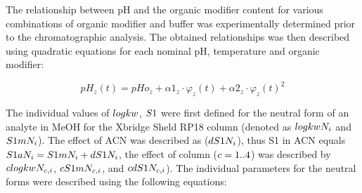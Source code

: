 \documentclass[
]{article}
\begin{document}
The relationship between pH and the organic modifier content for various
combinations of organic modifier and buffer was experimentally
determined prior to the chromatographic analysis. The obtained
relationships was then described using quadratic equations for each
nominal pH, temperature and organic modifier:

\[
pH_z(t)=pHo_z+\alpha 1_z\cdot \varphi_z(t)+\alpha2_z\cdot {\varphi_z(t)}^2
\]

The individual values of \(\small logkw\), \(\small S1\) were first
defined for the neutral form of an analyte in MeOH for the Xbridge Sheld
RP18 column (denoted as \(\small logkwN_i\) and \(\small S1mN_i\)). The
effect of ACN was described as (\(\small dS1N_i\)), thus S1 in ACN
equals \(\small S1aN_i = S1mN_i +dS1N_i\), the effect of column
(\(\small c=1..4\)) was described by \(\small clogkwN_{c,i}\),
\(\small cS1mN_{c,i}\), and \(\small cdS1N_{c,i}\)). The individual
parameters for the neutral forms were described using the following
equations:
\end{document}

